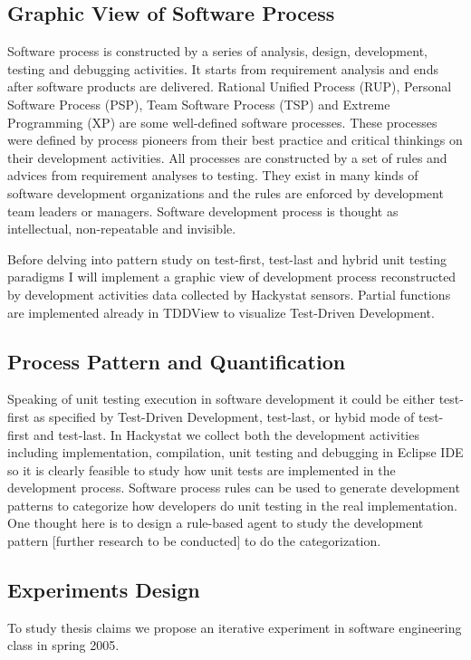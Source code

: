 \documentclass[11pt,twocolumn]{article}
\begin{document}
\subsection{Graphic View of Software Process}
Software process is constructed by a series of analysis, design,
development, testing and debugging activities. It starts from requirement
analysis and ends after software products are delivered. Rational Unified
Process (RUP), Personal Software Process (PSP), Team Software Process (TSP)
and Extreme Programming (XP) are some well-defined software processes.
These processes were defined by process pioneers from their best practice
and critical thinkings on their development activities. All processes are
constructed by a set of rules and advices from requirement analyses to
testing. They exist in many kinds of software development organizations and
the rules are enforced by development team leaders or managers. Software
development process is thought as intellectual, non-repeatable and invisible.

Before delving into pattern study on test-first, test-last and hybrid unit
testing paradigms I will implement a graphic view of development process
reconstructed by development activities data collected by Hackystat
sensors. Partial functions are implemented already in TDDView to visualize
Test-Driven Development.

\subsection{Process Pattern and Quantification}
Speaking of unit testing execution in software development it could be
either test-first as specified by Test-Driven Development, test-last, or
hybid mode of test-first and test-last. In Hackystat we collect both the
development activities including implementation, compilation, unit testing
and debugging in Eclipse IDE so it is clearly feasible to study how unit
tests are implemented in the development process. Software process rules
can be used to generate development patterns to categorize how developers
do unit testing in the real implementation. One thought here is to design a
rule-based agent to study the development pattern [further research to be
conducted] to do the categorization.

\subsection{Experiments Design}
To study thesis claims we propose an iterative experiment in software
engineering class in spring 2005.
\end{document}
